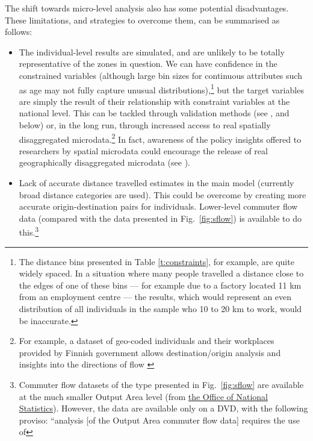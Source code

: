 The shift towards micro-level analysis also has some potential
disadvantages. These limitations,
and strategies to overcome them, can be summarised as follows:
\begin{itemize}
 \item The individual-level results are simulated, and are unlikely to be
 totally representative of the zones in question. We can have confidence
 in the constrained variables (although large bin sizes for continuous
 attributes such as age may not fully capture unusual
 distributions),\footnote{The
 distance bins presented in Table \ref{t:constraints}, for example,
 are quite widely spaced. In a situation where many people
 travelled a distance close to the edges of one of these bins --- for example
 due to a factory located 11 km from an employment centre --- the results,
 which would represent an even distribution of
 all individuals in the sample who 10 to 20 km to work, would
 be inaccurate.}
 but the target variables are simply the result of their relationship with
 constraint variables at the national level. This can be tackled through
 validation methods (see \citealp{Edwards2009}, and
 below) or, in the long run, through increased access to real spatially
 disaggregated
 microdata.\footnote{For example, a dataset of geo-coded
individuals and their workplaces provided by Finnish government allows
destination/origin analysis and insights into the directions of flow
\citep{Helminen2007}
}
In fact, awareness of the policy insights offered to researchers
by spatial microdata could encourage the release of real
geographically disaggregated microdata (see \citep{Lee2009}).
\item Lack of accurate distance travelled estimates in the main model
(currently broad distance categories are used). This could be overcome by creating
more accurate origin-destination pairs for individuals. Lower-level commuter
flow data (compared with the data presented in Fig.~\ref{fig:sflow}) is
available to do this.\footnote{Commuter flow
datasets of the type presented in Fig.~\ref{fig:sflow} are available at the much
smaller Output Area level
(from
\href{http://www.ons.gov.uk/ons/guide-method/census/census-2001/data-and-products/data-and-product-catalogue/origin---destination-statistics/output-areas/index.html}
{the Office of National Statistics}). However, the data are available only on a DVD, with the following proviso:
``analysis [of the Output Area commuter flow data] requires the use of
}
\end{itemize}
